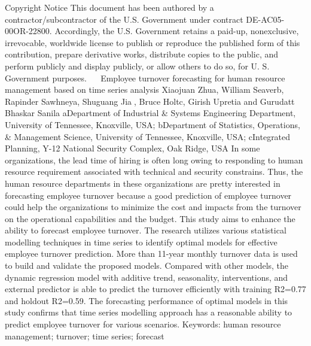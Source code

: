 Copyright Notice
This document has been authored by a contractor/subcontractor of the U.S. Government under contract DE-AC05-00OR-22800. Accordingly, the U.S. Government retains a paid-up, nonexclusive, irrevocable, worldwide license to publish or reproduce the published form of this contribution, prepare derivative works, distribute copies to the public, and perform publicly and display publicly, or allow others to do so, for U. S. Government purposes.  
Employee turnover forecasting for human resource management 
based on time series analysis
Xiaojuan Zhua, William Seaverb, Rapinder Sawhneya, Shuguang Jia, Bruce Holtc, Girish Upretia and Gurudatt Bhaskar Sanila
aDepartment of Industrial & Systems Engineering Department, University of Tennessee, Knoxville, USA; bDepartment of Statistics, Operations, & Management Science, University of Tennessee, Knoxville, USA; cIntegrated Planning, Y-12 National Security Complex, Oak Ridge, USA
In some organizations, the lead time of hiring is often long owing to responding to human resource requirement associated with technical and security constrains. Thus, the human resource departments in these organizations are pretty interested in forecasting employee turnover because a good prediction of employee turnover could help the organizations to minimize the cost and impacts from the turnover on the operational capabilities and the budget. This study aims to enhance the ability to forecast employee turnover. The research utilizes various statistical modelling techniques in time series to identify optimal models for effective employee turnover prediction. More than 11-year monthly turnover data is used to build and validate the proposed models. Compared with other models, the dynamic regression model with additive trend, seasonality, interventions, and external predictor is able to predict the turnover efficiently with training R2=0.77 and holdout R2=0.59. The forecasting performance of optimal models in this study confirms that time series modelling approach has a reasonable ability to predict employee turnover for various scenarios.
Keywords: human resource management; turnover; time series; forecast


